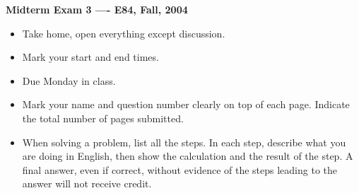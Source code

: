 \usepackage{html}

\begin{center}
{\Large \bf  Midterm Exam 3 ---- E84, Fall, 2004}
\end{center}

\begin{itemize}
\item Take home, open everything except discussion.
\item Mark your start and end times. %
\item Due Monday in class.
\item Mark your name and question number clearly on top of each page.
	Indicate the total number of pages submitted.
\item When solving a problem, list all the steps. In each step, describe 
	what you are doing in English, then show the calculation and the 
	result of the step. A final answer, even if correct, without 
	evidence of the steps leading to the answer will not receive credit.
\end{itemize}

